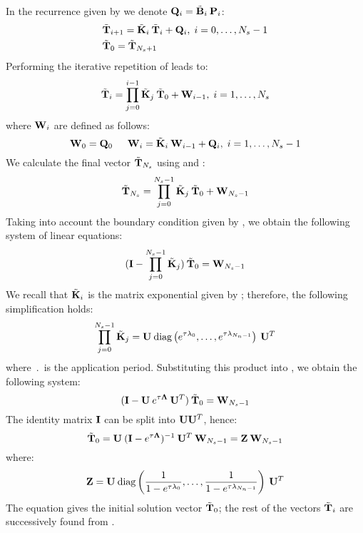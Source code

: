  \label{sec:ce-solution}
In the recurrence given by  we denote $\mathbf{Q}_i = \tilde{\mathbf{B}}_i \: \mathbf{P}_i$:
\begin{align}
  & \tilde{\mathbf{T}}_{i + 1} = \tilde{\mathbf{K}}_i \: \tilde{\mathbf{T}}_i + \mathbf{Q}_i, \; i = 0, \dots, N_s - 1 \label{eq:ce-recurrent} \\
  & \tilde{\mathbf{T}}_0 = \tilde{\mathbf{T}}_{N_s + 1} \nonumber
\end{align}
Performing the iterative repetition of  leads to:
\begin{equation} \label{eq:y-recurrent}
  \tilde{\mathbf{T}}_i = \prod_{j = 0}^{i - 1} \tilde{\mathbf{K}}_j \: \tilde{\mathbf{T}}_0 + \mathbf{W}_{i - 1}, \; i = 1, \dots, N_s
\end{equation}
where $\mathbf{W}_i$ are defined as follows:
\begin{equation}
  \mathbf{W}_0 = \mathbf{Q}_0 \hspace{15pt} \mathbf{W}_i = \tilde{\mathbf{K}}_i \: \mathbf{W}_{i - 1} + \mathbf{Q}_i, \; i = 1, \dots, N_s - 1 \label{eq:p-recurrent}
\end{equation}
We calculate the final vector $\tilde{\mathbf{T}}_{N_s}$ using  and :
\[
  \tilde{\mathbf{T}}_{N_s} = \prod_{j = 0}^{N_s - 1} \tilde{\mathbf{K}}_j \: \tilde{\mathbf{T}}_0 + \mathbf{W}_{N_s - 1}
\]
Taking into account the boundary condition given by , we obtain the following system of linear equations:
\begin{equation} \label{eq:core-system}
  (\mathbf{I} - \prod_{j = 0}^{N_s - 1} \tilde{\mathbf{K}}_j) \: \tilde{\mathbf{T}}_0 = \mathbf{W}_{N_s - 1}
\end{equation}
We recall that $\tilde{\mathbf{K}}_i$ is the matrix exponential given by ; therefore, the following simplification holds:
\[
  \prod_{j = 0}^{N_s - 1} \tilde{\mathbf{K}}_j = \mathbf{U} \: \text{diag} \left( e^{\tau \lambda_0}, \dots, e^{\tau \lambda_{N_n - 1}} \right) \: \mathbf{U}^T
\]
where $\period$ is the application period. Substituting this product into , we obtain the following system:
\[
  (\mathbf{I} - \mathbf{U} \: e^{\tau \mathbf{\Lambda}} \: \mathbf{U}^T) \: \tilde{\mathbf{T}}_0 = \mathbf{W}_{N_s - 1}
\]
The identity matrix $\mathbf{I}$ can be split into $\mathbf{U} \mathbf{U}^T$, hence:
\begin{equation} \label{eq:t0}
  \tilde{\mathbf{T}}_0 = \mathbf{U} \: (\mathbf{I} - e^{\tau \mathbf{\Lambda}})^{-1} \: \mathbf{U}^T \: \mathbf{W}_{N_s - 1} = \mathbf{Z} \: \mathbf{W}_{N_s - 1}
\end{equation}
where:
\[
  \mathbf{Z} = \mathbf{U} \: \text{diag} \left( \frac{1}{1 - e^{\tau \lambda_0}}, \dots, \frac{1}{1 - e^{\tau \lambda_{N_n - 1}}} \right) \: \mathbf{U}^T
\]
The equation gives the initial solution vector $\tilde{\mathbf{T}}_0$; the rest of the vectors $\tilde{\mathbf{T}}_i$ are successively found from .

